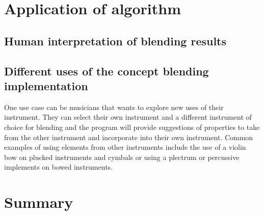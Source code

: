 


\section{Application of algorithm}

\subsection{Human interpretation of blending results}


\subsection{Different uses of the concept blending implementation}
One use case can be musicians that wants to explore new uses of their instrument. They can select their own instrument and a different instrument of choice for blending and the program will provide suggestions of properties to take from the other instrument and incorporate into their own instrument. Common examples of using elements from other instruments include the use of a violin bow on plucked instruments and cymbals or using a plectrum or percussive implements on bowed instruments.




\section{Summary}

